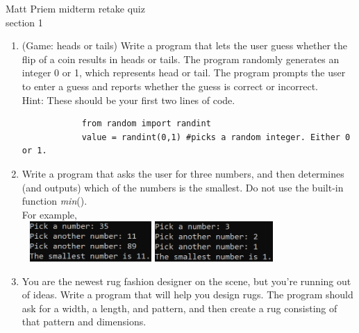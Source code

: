 \documentclass{article}
\begin{document}

Matt Priem \hfill midterm retake quiz\\
section 1\\
\begin{enumerate}
	\item 
		(Game: heads or tails)  Write a program that lets the user guess whether the flip of a coin 
		results in heads or tails.  The program randomly generates an integer 0 or 1, which 
		represents head or tail.  The program prompts the user to enter a guess and reports whether 
		the guess is correct or incorrect.\\
		Hint: These should be your first two lines of code.
		\begin{verbatim}
		    from random import randint
		    value = randint(0,1) #picks a random integer. Either 0 or 1.
		\end{verbatim}



	\item
		Write a program that asks the user for three numbers, and then determines (and outputs) which of the 
		numbers is the smallest.  Do not use the built-in function \textit{min}().\\
		For example, \\ \ \hfill
		\includegraphics[height = 0.6in]{./imgs/smallest_ex1.PNG} \hfill
		\includegraphics[height = 0.6in]{./imgs/smallest_ex2.PNG} \hfill \ 




	\item 
		You are the newest rug fashion designer on the scene, but you're running out of ideas. 
		Write a program that will help you design rugs.  The program should ask for a width, 
		a length, and pattern, and then create a rug consisting of that pattern and dimensions.


\end{enumerate}
\end{document}
